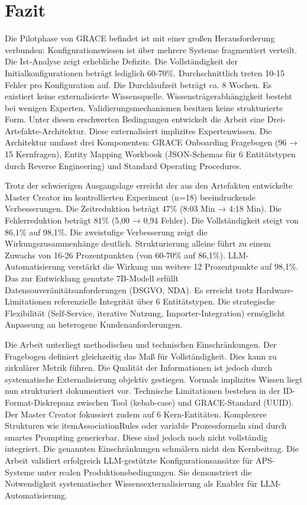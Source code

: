 \section{Fazit}
\label{sec:Fazit}

Die Pilotphase von GRACE befindet ist mit einer großen Herausforderung verbunden: Konfigurationswissen ist über mehrere Systeme fragmentiert verteilt. Die Ist-Analyse zeigt erhebliche Defizite. Die Vollständigkeit der Initialkonfigurationen beträgt lediglich 60-70\%. Durchschnittlich treten 10-15 Fehler pro Konfiguration auf. Die Durchlaufzeit beträgt ca. 8 Wochen. Es existiert keine externalisierte Wissensquelle. Wissensträgerabhängigkeit besteht bei wenigen Experten. Validierungsmechanismen besitzen keine strukturierte Form. Unter diesen erschwerten Bedingungen entwickelt die Arbeit eine Drei-Artefakte-Architektur. Diese externalisiert implizites Expertenwissen. Die Architektur umfasst drei Komponenten: GRACE Onboarding Fragebogen (96 → 15 Kernfragen), Entity Mapping Workbook (JSON-Schemas für 6 Entitätstypen durch Reverse Engineering) und Standard Operating Procedures.

Trotz der schwierigen Ausgangslage erreicht der aus den Artefakten entwickelte Master Creator im kontrollierten Experiment (n=18) beeindruckende Verbesserungen. Die Zeitreduktion beträgt 47\% (8:03 Min → 4:18 Min). Die Fehlerreduktion beträgt 81\% (5,00 → 0,94 Fehler). Die Vollständigkeit steigt von 86,1\% auf 98,1\%. Die zweistufige Verbesserung zeigt die Wirkungszusammenhänge deutlich. Strukturierung alleine führt zu einem Zuwachs von 16-26 Prozentpunkten (von 60-70\% auf 86,1\%). LLM-Automatisierung verstärkt die Wirkung um weitere 12 Prozentpunkte auf 98,1\%. Das zur Entwicklung genutzte 7B-Modell erfüllt Datensouveränitätsanforderungen (DSGVO, NDA). Es erreicht trotz Hardware-Limitationen referenzielle Integrität über 6 Entitätstypen. Die strategische Flexibilität (Self-Service, iterative Nutzung, Importer-Integration) ermöglicht Anpassung an heterogene Kundenanforderungen.

Die Arbeit unterliegt methodischen und technischen Einschränkungen. Der Fragebogen definiert gleichzeitig das Maß für Vollständigkeit. Dies kann zu zirkulärer Metrik führen. Die Qualität der Informationen ist jedoch durch systematische Externalisierung objektiv gestiegen. Vormals implizites Wissen liegt nun strukturiert dokumentiert vor. Technische Limitationen bestehen in der ID-Format-Diskrepanz zwischen Tool (kebab-case) und GRACE-Standard (UUID). Der Master Creator fokussiert zudem auf 6 Kern-Entitäten. Komplexere Strukturen wie itemAssociationRules oder variable Prozessformeln sind durch smartes Prompting generierbar. Diese sind jedoch noch nicht vollständig integriert. Die genannten Einschränkungen schmälern nicht den Kernbeitrag. Die Arbeit validiert erfolgreich LLM-gestützte Konfigurationsansätze für APS-Systeme unter realen Produktionsbedingungen. Sie demonstriert die Notwendigkeit systematischer Wissensexternalisierung als Enabler für LLM-Automatisierung.

